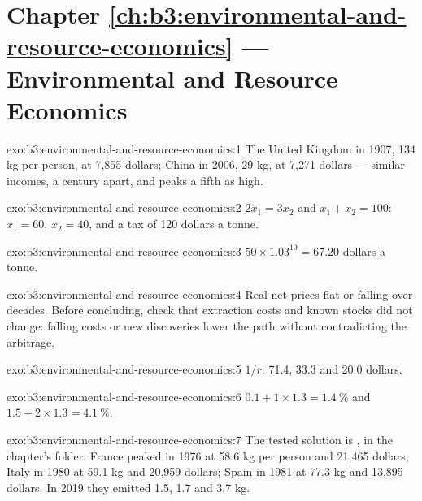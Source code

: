 \section*{Chapter \ref{ch:b3:environmental-and-resource-economics} --- Environmental and Resource Economics}

\begin{solution}{exo:b3:environmental-and-resource-economics:1}
The United Kingdom in 1907, 134 kg per person, at 7{,}855 dollars; China in 2006, 29 kg, at 7{,}271 dollars --- similar incomes, a
century apart, and peaks a fifth as high. %
\end{solution}

\begin{solution}{exo:b3:environmental-and-resource-economics:2}
$2x_1 = 3x_2$ and $x_1 + x_2 = 100$: $x_1 = 60$, $x_2 = 40$, and a tax of 120 dollars a tonne.
\end{solution}

\begin{solution}{exo:b3:environmental-and-resource-economics:3}
$50 \times 1.03^{10} = 67.20$ dollars a tonne.
\end{solution}

\begin{solution}{exo:b3:environmental-and-resource-economics:4}
Real net prices flat or falling over decades. Before concluding, check that
extraction costs and known stocks did not change: falling costs or new discoveries
lower the path without contradicting the arbitrage.
\end{solution}

\begin{solution}{exo:b3:environmental-and-resource-economics:5}
$1/r$: 71.4, 33.3 and 20.0 dollars.
\end{solution}

\begin{solution}{exo:b3:environmental-and-resource-economics:6}
$0.1 + 1 \times 1.3 = 1.4~\%$ and $1.5 + 2 \times 1.3 = 4.1~\%$.
\end{solution}

\begin{solution}{exo:b3:environmental-and-resource-economics:7}
The tested solution is , in the chapter's 
folder. France peaked in 1976 at 58.6 kg per person and 21{,}465 dollars; Italy in 1980 at 59.1 kg and 20{,}959 dollars; Spain in 1981 at 77.3 kg
and 13{,}895 dollars. In 2019 they emitted 1.5, 1.7 and 3.7 kg. %
\end{solution}

